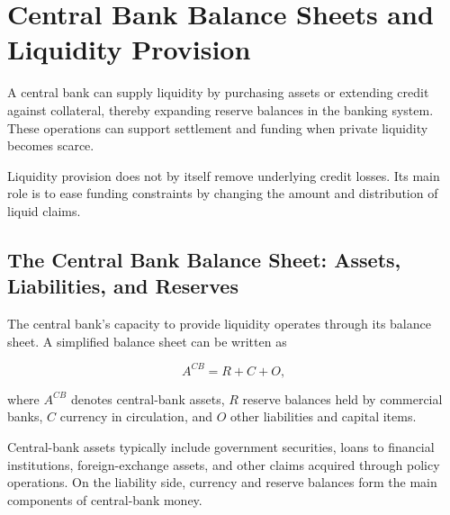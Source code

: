 \section{Central Bank Balance Sheets and Liquidity Provision}

A central bank can supply liquidity by purchasing assets or extending credit against collateral, thereby expanding reserve balances in the banking system. These operations can support settlement and funding when private liquidity becomes scarce.

Liquidity provision does not by itself remove underlying credit losses. Its main role is to ease funding constraints by changing the amount and distribution of liquid claims.


\subsection{The Central Bank Balance Sheet: Assets, Liabilities, and Reserves}

The central bank's capacity to provide liquidity operates through its balance sheet. A simplified balance sheet can be written as

\begin{equation}
A^{CB}=R+C+O,
\label{eq:ch22-cb-balance-sheet}
\end{equation}

where \(A^{CB}\) denotes central-bank assets, \(R\) reserve balances held by commercial banks, \(C\) currency in circulation, and \(O\) other liabilities and capital items.

Central-bank assets typically include government securities, loans to financial institutions, foreign-exchange assets, and other claims acquired through policy operations. On the liability side, currency and reserve balances form the main components of central-bank money.

